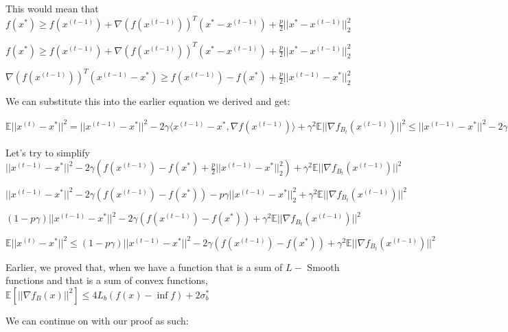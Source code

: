 This would mean that $f(x^*) \geq f(x^{(t - 1)}) + \nabla(f(x^{(t - 1)}))^T (x^* - x^{(t - 1)}) + \frac{p}{2} ||x^* - x^{(t - 1)}||^2_2$ \newline 


$f(x^*) \geq f(x^{(t - 1)}) + \nabla(f(x^{(t - 1)}))^T (x^* - x^{(t - 1)}) + \frac{p}{2} ||x^* - x^{(t - 1)}||^2_2$ \newline 


$\nabla(f(x^{(t - 1)}))^T (x^{(t - 1)} - x^*) \geq f(x^{(t - 1)}) - f(x^*) + \frac{p}{2} ||x^{(t - 1)} - x^*||^2_2$ \newline 

We can substitute this into the earlier equation we derived and get: \newline 

$\mathbb{E}||x^{(t)} - x^*||^2 = ||x^{(t - 1)} - x^*||^2 - 2\gamma \langle x^{(t - 1)} - x^*,  \nabla f(x^{(t - 1)})\rangle + \gamma^2 \mathbb{E} ||\nabla f_{B_t}(x^{(t - 1)})||^2 \leq ||x^{(t - 1)} - x^*||^2 - 2\gamma (f(x^{(t - 1)}) - f(x^*) + \frac{p}{2} ||x^{(t - 1)} - x^*||^2_2) + \gamma^2 \mathbb{E} ||\nabla f_{B_t}(x^{(t - 1)})||^2$ \newline 

Let's try to simplify $||x^{(t - 1)} - x^*||^2 - 2\gamma (f(x^{(t - 1)}) - f(x^*) + \frac{p}{2} ||x^{(t - 1)} - x^*||^2_2) + \gamma^2 \mathbb{E} ||\nabla f_{B_t}(x^{(t - 1)})||^2$ \newline 

$||x^{(t - 1)} - x^*||^2 - 2\gamma (f(x^{(t - 1)}) - f(x^*)) - p \gamma ||x^{(t - 1)} - x^*||^2_2 + \gamma^2 \mathbb{E} ||\nabla f_{B_t}(x^{(t - 1)})||^2$ \newline 


$(1 - p \gamma)||x^{(t - 1)} - x^*||^2 - 2\gamma (f(x^{(t - 1)}) - f(x^*))+ \gamma^2 \mathbb{E} ||\nabla f_{B_t}(x^{(t - 1)})||^2$ \newline 

$\mathbb{E}||x^{(t)} - x^*||^2  \leq (1 - p \gamma)||x^{(t - 1)} - x^*||^2 - 2\gamma (f(x^{(t - 1)}) - f(x^*))+ \gamma^2 \mathbb{E} ||\nabla f_{B_t}(x^{(t - 1)})||^2$ \newline 

Earlier, we proved that, when we have a function that is a sum of $L-$ Smooth functions and that is a sum of convex functions, $\mathbb{E}[||\nabla f_B(x)||^2] \leq 4L_{b} (f(x) - \inf f) + 2 \sigma_b^*$ \newline 

We can continue on with our proof as such: \newline 


